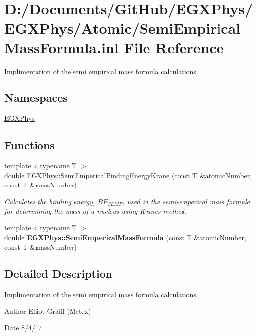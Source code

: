 \hypertarget{_semi_empirical_mass_formula_8inl}{}\section{D\+:/\+Documents/\+Git\+Hub/\+E\+G\+X\+Phys/\+E\+G\+X\+Phys/\+Atomic/\+Semi\+Empirical\+Mass\+Formula.inl File Reference}
\label{_semi_empirical_mass_formula_8inl}


Implimentation of the semi empirical mass formula calculations.  


\subsection*{Namespaces}
\begin{DoxyCompactItemize}
\item 
 \hyperlink{namespace_e_g_x_phys}{E\+G\+X\+Phys}
\end{DoxyCompactItemize}
\subsection*{Functions}
\begin{DoxyCompactItemize}
\item 
{\footnotesize template$<$typename T $>$ }\\double \hyperlink{group___semi_empirical_mass_formula_ga99c5a87be2c76d3fa4852654c3fd59a9}{E\+G\+X\+Phys\+::\+Semi\+Emperical\+Binding\+Energy\+Krane} (const T \&atomic\+Number, const T \&mass\+Number)
\begin{DoxyCompactList}\small\item\em Calculates the binding energy, $BE_{SEMF}$, used in the semi-\/emperical mass formula for determining the mass of a nucleus using Krane\textquotesingle{}s method. \end{DoxyCompactList}\item 
{\footnotesize template$<$typename T $>$ }\\double {\bfseries E\+G\+X\+Phys\+::\+Semi\+Emperical\+Mass\+Formula} (const T \&atomic\+Number, const T \&mass\+Number)
\end{DoxyCompactItemize}


\subsection{Detailed Description}
Implimentation of the semi empirical mass formula calculations. 

\begin{DoxyAuthor}{Author}
Elliot Grafil (Metex) 
\end{DoxyAuthor}
\begin{DoxyDate}{Date}
8/4/17 
\end{DoxyDate}
